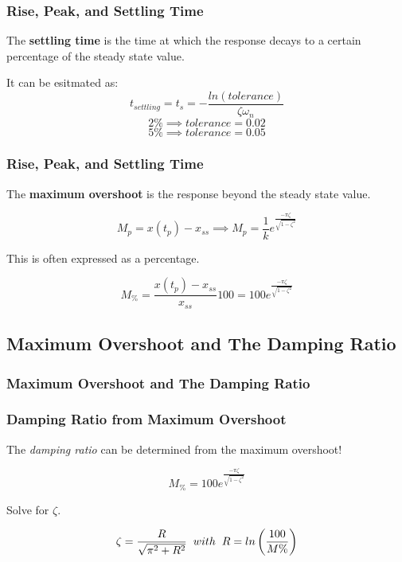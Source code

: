\documentclass[fleqn]{beamer} %
\newcommand{\sectionIVsubsectionIItitle}{Rise, Peak, and Settling Time}
\newcommand{\sectionIVsubsectionIIItitle}{Maximum Overshoot and The Damping Ratio}
\begin{document}
			\begin{frame}
				\frametitle{\sectionIVsubsectionIItitle}
				\bigskip


				The {\bf settling time} is the time at which the response decays to a certain percentage of the steady state value.\vspc

				It can be esitmated as:\vspc
				\[ t_{settling}=t_s=-\frac{ln(tolerance)}{\zeta\omega_n} \] 
				\[ 2\%\implies tolerance=0.02 \]
				\[ 5\%\implies tolerance=0.05 \]


				\btVFill
			\end{frame}

			\begin{frame}
				\frametitle{\sectionIVsubsectionIItitle}
				\bigskip


				The {\bf maximum overshoot} is the response beyond the steady state value. \vspc

				\[ M_p=x(t_p)-x_{ss}\implies M_p=\frac{1}{k}e^{\frac{-\pi\zeta}{\sqrt{1-\zeta^2}}} \]

				This is often expressed as a percentage. \vspc

				\[ M_\%=\frac{x(t_p)-x_{ss}}{x_{ss}}100=100e^{\frac{-\pi\zeta}{\sqrt{1-\zeta^2}} } \]



				\btVFill
			\end{frame}


		\subsection{\sectionIVsubsectionIIItitle}\label{sectionIVsubsectionIV}

			\begin{frame}
				\frametitle{\sectionIVsubsectionIIItitle}
				\bigskip

				\frametitle{Damping Ratio from Maximum Overshoot}

				The {\it damping ratio} can be determined from the maximum overshoot! \vspc

				\[ M_\%=100e^{\frac{-\pi\zeta}{\sqrt{1-\zeta^2}}} \] 

				Solve for $\zeta$.\vspc

				\[ \zeta=\frac{R}{\sqrt{\pi^2+R^2}} \hspc with \hspc R=ln\left(\frac{100}{M\%}\right) \]


				\btVFill
			\end{frame}
\end{document}
